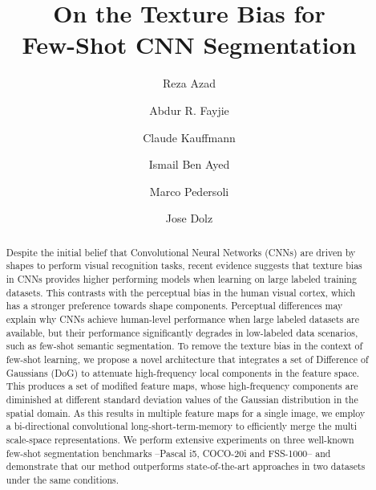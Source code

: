 \documentclass[runningheads]{llncs}
\begin{document}
\pagestyle{headings}
\mainmatter
\def\ECCVSubNumber{1566}  

\title{On the Texture Bias for \\ Few-Shot CNN Segmentation}  

\begin{comment}
\titlerunning{ECCV-20 submission ID \ECCVSubNumber} 
\authorrunning{ECCV-20 submission ID \ECCVSubNumber} 
\author{Anonymous ECCV submission}
\institute{Paper ID \ECCVSubNumber}
\end{comment}


\author{Reza Azad \and
Abdur R. Fayjie \and
Claude Kauffmann \and
Ismail Ben Ayed \and
Marco Pedersoli \and
Jose Dolz}
\maketitle

\begin{abstract}




Despite the initial belief that Convolutional Neural Networks (CNNs) are driven by shapes to perform visual recognition tasks, recent evidence suggests that texture bias in CNNs provides higher performing models when learning on large labeled training datasets. This contrasts with the perceptual bias in the human visual cortex, which has a stronger preference towards shape components. Perceptual differences may explain why CNNs achieve human-level performance when large labeled datasets are available, but their performance significantly degrades in low-labeled data scenarios, such as few-shot semantic segmentation. To remove the texture bias in the context of few-shot learning, we propose a novel architecture that integrates a set of Difference of Gaussians (DoG) to attenuate high-frequency local components in the feature space. This produces a set of modified feature maps, whose high-frequency components are diminished at different standard deviation values of the Gaussian distribution in the spatial domain. As this results in multiple feature maps for a single image, we employ a bi-directional convolutional long-short-term-memory to efficiently merge the multi scale-space representations. We perform extensive experiments on three well-known few-shot segmentation benchmarks --Pascal i5, COCO-20i and FSS-1000-- and demonstrate that our method outperforms state-of-the-art approaches in two datasets under the same conditions.


\end{abstract}
\end{document}
